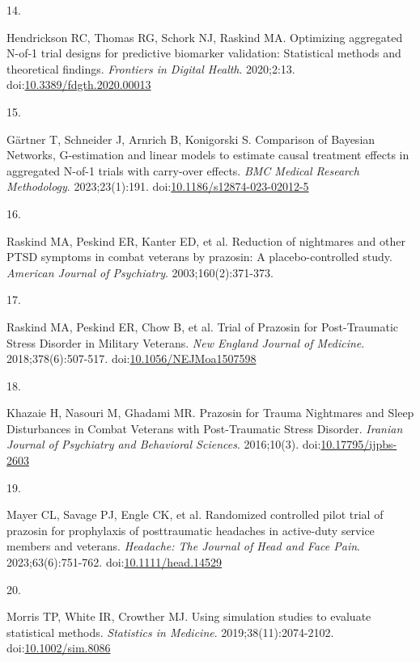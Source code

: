 \documentclass[
  11pt,
]{article}
\newlength{\cslhangindent}
\newlength{\csllabelwidth}
\newenvironment{CSLReferences}[2] %
 {\begin{list}{}{%
  \setlength{\itemindent}{0pt}
  \setlength{\leftmargin}{0pt}
  \setlength{\parsep}{0pt}
  \ifodd #1
   \setlength{\leftmargin}{\cslhangindent}
   \setlength{\itemindent}{-1\cslhangindent}
  \fi
  \setlength{\itemsep}{#2\baselineskip}}}
 {\end{list}}
\newcommand{\CSLLeftMargin}[1]{\parbox[t]{\csllabelwidth}{\strut#1\strut}}
\newcommand{\CSLRightInline}[1]{\parbox[t]{\linewidth - \csllabelwidth}{\strut#1\strut}}
\begin{document}
\begin{CSLReferences}{0}{1}
\CSLLeftMargin{14. }%
\CSLRightInline{Hendrickson RC, Thomas RG, Schork NJ, Raskind MA. Optimizing aggregated {N}-of-1 trial designs for predictive biomarker validation: Statistical methods and theoretical findings. \emph{Frontiers in Digital Health}. 2020;2:13. doi:\href{https://doi.org/10.3389/fdgth.2020.00013}{10.3389/fdgth.2020.00013}}

\CSLLeftMargin{15. }%
\CSLRightInline{Gärtner T, Schneider J, Arnrich B, Konigorski S. Comparison of {Bayesian Networks}, {G-estimation} and linear models to estimate causal treatment effects in aggregated {N-of-1} trials with carry-over effects. \emph{BMC Medical Research Methodology}. 2023;23(1):191. doi:\href{https://doi.org/10.1186/s12874-023-02012-5}{10.1186/s12874-023-02012-5}}

\CSLLeftMargin{16. }%
\CSLRightInline{{Raskind MA, Peskind ER, Kanter ED, et al.} Reduction of nightmares and other {PTSD} symptoms in combat veterans by prazosin: A placebo-controlled study. \emph{American Journal of Psychiatry}. 2003;160(2):371-373.}

\CSLLeftMargin{17. }%
\CSLRightInline{Raskind MA, Peskind ER, Chow B, et al. Trial of {Prazosin} for {Post-Traumatic Stress Disorder} in {Military Veterans}. \emph{New England Journal of Medicine}. 2018;378(6):507-517. doi:\href{https://doi.org/10.1056/NEJMoa1507598}{10.1056/NEJMoa1507598}}

\CSLLeftMargin{18. }%
\CSLRightInline{Khazaie H, Nasouri M, Ghadami MR. Prazosin for {Trauma Nightmares} and {Sleep Disturbances} in {Combat Veterans} with {Post-Traumatic Stress Disorder}. \emph{Iranian Journal of Psychiatry and Behavioral Sciences}. 2016;10(3). doi:\href{https://doi.org/10.17795/ijpbs-2603}{10.17795/ijpbs-2603}}

\CSLLeftMargin{19. }%
\CSLRightInline{Mayer CL, Savage PJ, Engle CK, et al. Randomized controlled pilot trial of prazosin for prophylaxis of posttraumatic headaches in active-duty service members and veterans. \emph{Headache: The Journal of Head and Face Pain}. 2023;63(6):751-762. doi:\href{https://doi.org/10.1111/head.14529}{10.1111/head.14529}}

\CSLLeftMargin{20. }%
\CSLRightInline{Morris TP, White IR, Crowther MJ. Using simulation studies to evaluate statistical methods. \emph{Statistics in Medicine}. 2019;38(11):2074-2102. doi:\href{https://doi.org/10.1002/sim.8086}{10.1002/sim.8086}}


\end{CSLReferences}
\end{document}
